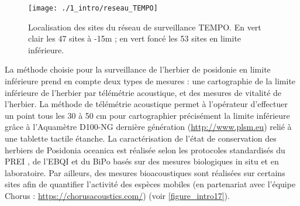 \begin{figure}[H]
	\begin{center}
	\texttt{[image: ./1\_intro/reseau\_TEMPO]}
		\caption[Localisation des sites du réseau de surveillance TEMPO]{Localisation des sites du réseau de surveillance TEMPO. En vert clair les 47 sites à -15m ; en vert foncé les 53 sites en limite inférieure.}
	\label{figure_intro16}
\end{center}
\end{figure}

La méthode choisie pour la surveillance de l’herbier de posidonie en limite inférieure prend en compte deux types de mesures : une cartographie de la limite inférieure de l’herbier par télémétrie acoustique, et des mesures de vitalité de l’herbier. La méthode de télémétrie acoustique permet à l’opérateur d’effectuer un point tous les 30 à 50 cm pour cartographier précisément la limite inférieure grâce à l’Aquamètre D100-NG dernière génération (\href{http://www.plsm.eu}{http://www.plsm.eu}) relié à une tablette tactile étanche. La caractérisation de l’état de conservation des herbiers de Posidonia oceanica est réalisée selon les protocoles standardisés du PREI \citep{gobert_assessment_2009}, de l’EBQI \citep{personnic_ecosystem-based_2014} et du BiPo \citep{lopez_y_royo_biotic_2010} basés sur des mesures biologiques in situ et en laboratoire. Par ailleurs, des mesures bioacoustiques sont réalisées sur certains sites afin de quantifier l’activité des espèces mobiles (en partenariat avec l’équipe Chorus : \href{https://chorusacoustics.com/}{https://chorusacoustics.com/}) (voir \autoref{figure_intro17}).

\setlength{\fboxsep}{3pt}
\setlength{\fboxrule}{0.6pt}
\noindent{}

